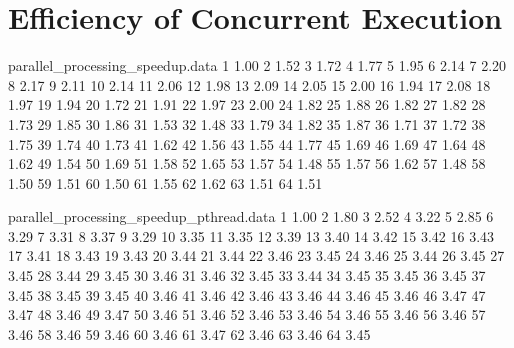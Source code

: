 \section{Efficiency of Concurrent Execution}

\begin{filecontents}{parallel_processing_speedup.data}
1  1.00
2  1.52
3  1.72
4  1.77
5  1.95
6  2.14
7  2.20
8  2.17
9  2.11
10 2.14
11 2.06
12 1.98
13 2.09
14 2.05
15 2.00
16 1.94
17 2.08
18 1.97
19 1.94
20 1.72
21 1.91
22 1.97
23 2.00
24 1.82
25 1.88
26 1.82
27 1.82
28 1.73
29 1.85
30 1.86
31 1.53
32 1.48
33 1.79
34 1.82
35 1.87
36 1.71
37 1.72
38 1.75
39 1.74
40 1.73
41 1.62
42 1.56
43 1.55
44 1.77
45 1.69
46 1.69
47 1.64
48 1.62
49 1.54
50 1.69
51 1.58
52 1.65
53 1.57
54 1.48
55 1.57
56 1.62
57 1.48
58 1.50
59 1.51
60 1.50
61 1.55
62 1.62
63 1.51
64 1.51
\end{filecontents}

\begin{filecontents}{parallel_processing_speedup_pthread.data}
1 1.00
2 1.80
3 2.52
4 3.22
5 2.85
6 3.29
7 3.31
8 3.37
9 3.29
10 3.35
11 3.35
12 3.39
13 3.40
14 3.42
15 3.42
16 3.43
17 3.41
18 3.43
19 3.43
20 3.44
21 3.44
22 3.46
23 3.45
24 3.46
25 3.44
26 3.45
27 3.45
28 3.44
29 3.45
30 3.46
31 3.46
32 3.45
33 3.44
34 3.45
35 3.45
36 3.45
37 3.45
38 3.45
39 3.45
40 3.46
41 3.46
42 3.46
43 3.46
44 3.46
45 3.46
46 3.47
47 3.47
48 3.46
49 3.47
50 3.46
51 3.46
52 3.46
53 3.46
54 3.46
55 3.46
56 3.46
57 3.46
58 3.46
59 3.46
60 3.46
61 3.47
62 3.46
63 3.46
64 3.45
\end{filecontents}

